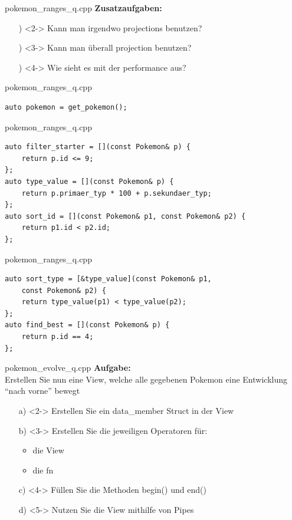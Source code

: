 \begin{frame}{pokemon\_ranges\_q.cpp}
    \textbf{Zusatzaufgaben:}\\
    \begin{enumerate} %
        \item[\✨)]<2-> Kann man irgendwo projections benutzen?
        \item[\✨)]<3-> Kann man überall projection benutzen?
        \item[\✨)]<4-> Wie sieht es mit der performance aus?
    \end{enumerate}
\end{frame}

\begin{frame}[fragile]{pokemon\_ranges\_q.cpp}
    \begin{verbatim}
auto pokemon = get_pokemon();
    \end{verbatim}
\end{frame}

\begin{frame}[fragile]{pokemon\_ranges\_q.cpp}
    \begin{verbatim}
auto filter_starter = [](const Pokemon& p) {
    return p.id <= 9;
};
auto type_value = [](const Pokemon& p) {
    return p.primaer_typ * 100 + p.sekundaer_typ;
};
auto sort_id = [](const Pokemon& p1, const Pokemon& p2) {
    return p1.id < p2.id;
};
    \end{verbatim}
\end{frame}

\begin{frame}[fragile]{pokemon\_ranges\_q.cpp}
    \begin{verbatim}
auto sort_type = [&type_value](const Pokemon& p1,
    const Pokemon& p2) {
    return type_value(p1) < type_value(p2);
};
auto find_best = [](const Pokemon& p) {
    return p.id == 4;
};
    \end{verbatim}
\end{frame}

\begin{frame}{pokemon\_evolve\_q.cpp}
    \textbf{Aufgabe:}\\
    Erstellen Sie nun eine View, welche alle gegebenen Pokemon eine Entwicklung \enquote{nach vorne} bewegt

    \vspace{1.5em}

    \begin{enumerate} %
        \item[a)]<2-> Erstellen Sie ein data\_member Struct in der View
        \item[b)]<3-> Erstellen Sie die jeweiligen Operatoren für:

        \begin{itemize}
            \item die View
            \item die fn
        \end{itemize}
        \item[c)]<4-> Füllen Sie die Methoden begin() und end()
        \item[d)]<5-> Nutzen Sie die View mithilfe von Pipes
    \end{enumerate}
\end{frame}

